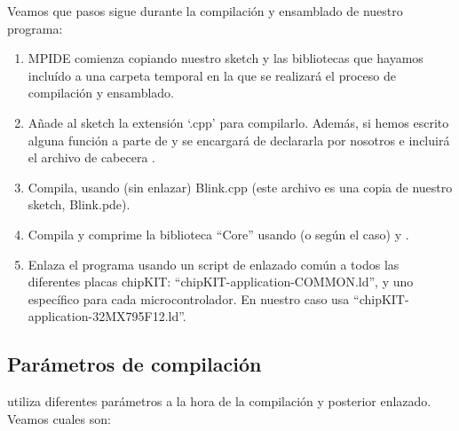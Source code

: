 Veamos que pasos sigue  durante la compilación y ensamblado de nuestro programa:
\begin{enumerate}
    \item MPIDE comienza copiando nuestro sketch y las bibliotecas que hayamos incluído a una carpeta temporal en la que se realizará el proceso de compilación y ensamblado.
    \item Añade al sketch la extensión `.cpp' para compilarlo. Además, si hemos escrito alguna función a parte de  y  se encargará de declararla por nosotros e incluirá el archivo de cabecera .
    \item Compila, usando  (sin enlazar) Blink.cpp (este archivo es una copia de nuestro sketch, Blink.pde).
    \item Compila y comprime la biblioteca ``Core'' usando  (o  según el caso) y .
    \item Enlaza el programa usando un script de enlazado común a todos las diferentes placas chipKIT: ``chipKIT-application-COMMON.ld'', y uno específico para cada microcontrolador. En nuestro caso usa ``chipKIT-application-32MX795F12.ld''.
\end{enumerate}

\subsection{Parámetros de compilación}
 utiliza diferentes parámetros a la hora de la compilación y posterior enlazado. Veamos cuales son:\\

